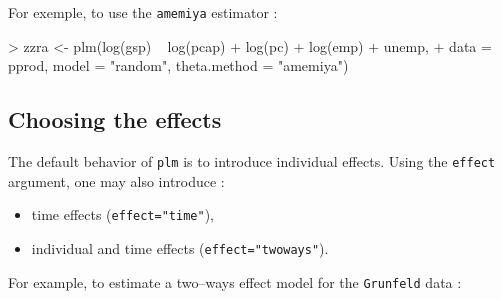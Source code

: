 \documentclass{article}
\begin{document}
For exemple, to use the \texttt{amemiya} estimator :

\begin{Schunk}
\begin{Sinput}
> zzra <- plm(log(gsp) ~ log(pcap) + log(pc) + log(emp) + unemp, 
+     data = pprod, model = "random", theta.method = "amemiya")
\end{Sinput}
\end{Schunk}


\subsection{Choosing  the effects}

The default behavior of \texttt{plm} is to introduce individual
effects. Using the \texttt{effect} argument, one may also introduce :

\begin{itemize}
\item time effects (\texttt{effect="time"}),
\item individual and time effects (\texttt{effect="twoways"}).
\end{itemize}

For example, to estimate a two--ways effect model for the
\texttt{Grunfeld} data :
\end{document}

